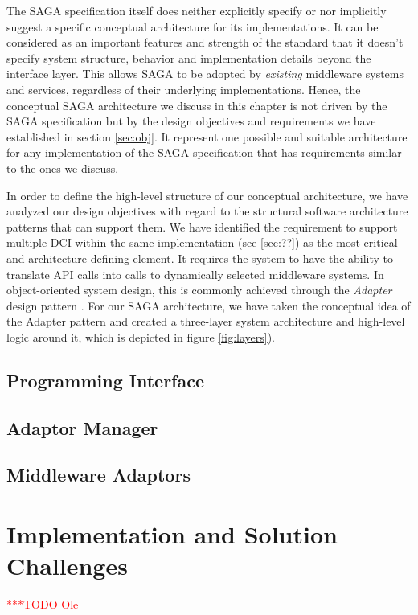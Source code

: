 \documentclass[a4paper,12pt]{article}
\newcommand{\todo}[1]{     {\textcolor{red}  { ***TODO      #1 }}}
\newcommand{\todo}[1]{}
\begin{document}
The SAGA specification itself does neither explicitly specify or nor implicitly
suggest a specific conceptual architecture for its implementations. It can be
considered as an important features and strength of the standard that it
doesn't specify system structure, behavior and implementation details beyond
the interface layer. This allows SAGA to be adopted by \textit{existing}
middleware systems and services, regardless of their underlying
implementations.  Hence, the conceptual SAGA architecture we discuss in this
chapter is not driven by the SAGA specification but by the design objectives
and requirements we have established in section \ref{sec:obj}. It
represent one possible and suitable architecture for any implementation of
the SAGA specification that has requirements similar to the ones we discuss. 

In order to define the high-level structure of our conceptual architecture, we
have analyzed our design objectives with regard to the structural software
architecture patterns that can support them. We have identified the requirement
to support multiple DCI within the same implementation (see \ref{sec:??}) as
the most critical and architecture defining element. It requires the system to
have the ability to translate API calls into calls to dynamically selected
middleware systems. In object-oriented system design, this is commonly achieved
through the \textit{Adapter} design pattern \cite{XXX}. For our SAGA
architecture, we have taken the conceptual idea of the Adapter pattern and
created a three-layer system architecture and high-level logic around it, which
is depicted in figure \ref{fig:layers}).


\subsection{Programming Interface}

\subsection{Adaptor Manager}

\subsection{Middleware Adaptors}


% 
\section{Implementation and Solution Challenges}\todo{Ole}
\end{document}
